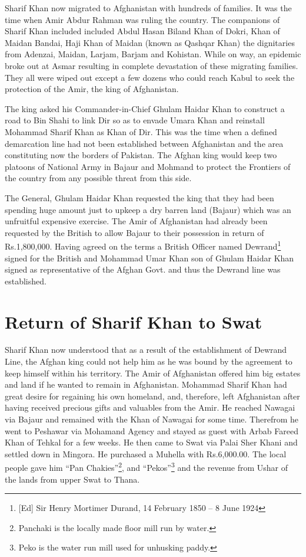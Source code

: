\documentclass[twoside,openright]{book}
\begin{document}
Sharif Khan now migrated to Afghanistan with hundreds of families. It was the
time when Amir Abdur Rahman was ruling the country. The companions of Sharif
Khan included included Abdul Hasan Biland Khan of Dokri, Khan of Maidan Bandai,
Haji Khan of Maidan (known as Qashqar Khan) the dignitaries from Adenzai,
Maidan, Larjam, Barjam and Kohistan. While on way, an epidemic broke out at
Asmar resulting in complete devastation of these migrating families. They all
were wiped out except a few dozens who could reach Kabul to seek the protection
of the Amir, the king of Afghanistan.

The king asked his Commander-in-Chief Ghulam Haidar Khan to construct a road to
Bin Shahi to link Dir so as to envade Umara Khan and reinstall Mohammad Sharif
Khan as Khan of Dir. This was the time when a defined demarcation line had not
been established between Afghanistan and the area constituting now the borders
of Pakistan. The Afghan king would keep two platoons of National Army in Bajaur
and Mohmand to protect the Frontiers of the country from any possible threat
from this side.

The General, Ghulam Haidar Khan requested the king that they had been spending
huge amount just to upkeep a dry barren land (Bajaur) which was an unfruitful
expensive exercise. The Amir of Afghanistan had already been requested by the
British to allow Bajaur to their possession in return of Rs.1,800,000. Having
agreed on the terms a British Officer named Dewrand\footnote{[Ed] Sir Henry Mortimer
Durand, 14 February 1850 – 8 June 1924} signed for the British and Mohammad Umar
Khan son of Ghulam Haidar Khan signed as representative of the Afghan Govt. and
thus the Dewrand line was established.

\section{Return of Sharif Khan to Swat}

Sharif Khan now understood that as a result of the establishment of Dewrand
Line, the Afghan king could not help him as he was bound by the agreement to
keep himself within his territory. The Amir of Afghanistan offered him big
estates and land if he wanted to remain in Afghanistan. Mohammad Sharif Khan had
great desire for regaining his own homeland, and, therefore, left Afghanistan
after having received precious gifts and valuables from the Amir. He reached
Nawagai via Bajaur and remained with the Khan of Nawagai for some time.
Therefrom he went to Peshawar via Mohamand Agency and stayed as guest with Arbab
Fareed Khan of Tehkal for a few weeks. He then came to Swat via Palai Sher Khani
and settled down in Mingora. He purchased a Muhella with Rs.6,000.00. The local
people gave him ``Pan Chakies''\footnote{Panchaki is the locally made floor mill
run by water.}, and ``Pekos''\footnote{Peko is the water run mill used for
unhusking paddy.} and the revenue from Ushar of the lands from upper Swat to
Thana.
\end{document}
